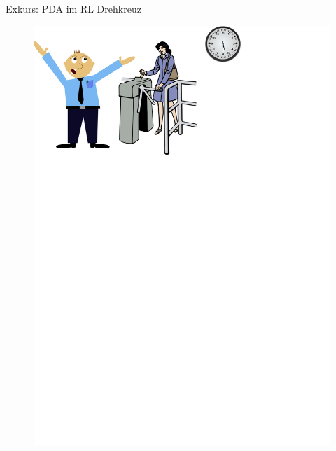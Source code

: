 \begin{frame}{Exkurs: PDA im RL}
	Drehkreuz
	\begin{center}
		\begin{figure}
			\includegraphics[width=\linewidth]{images/turnstile}
		\end{figure}
	\end{center}
\end{frame}